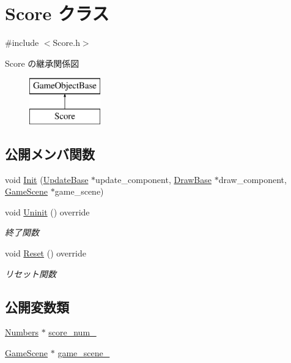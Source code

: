 \hypertarget{class_score}{}\section{Score クラス}
\label{class_score}


{\ttfamily \#include $<$Score.\+h$>$}

Score の継承関係図\begin{figure}[H]
\begin{center}
\leavevmode
\includegraphics[height=2.000000cm]{class_score}
\end{center}
\end{figure}
\subsection*{公開メンバ関数}
\begin{DoxyCompactItemize}
\item 
void \mbox{\hyperlink{class_score_a7d461a8b72ddfd00213858286d702486}{Init}} (\mbox{\hyperlink{class_update_base}{Update\+Base}} $\ast$update\+\_\+component, \mbox{\hyperlink{class_draw_base}{Draw\+Base}} $\ast$draw\+\_\+component, \mbox{\hyperlink{class_game_scene}{Game\+Scene}} $\ast$game\+\_\+scene)
\item 
void \mbox{\hyperlink{class_score_a605e163dc59ccc4d19a3cb6b5db813b8}{Uninit}} () override
\begin{DoxyCompactList}\small\item\em 終了関数 \end{DoxyCompactList}\item 
void \mbox{\hyperlink{class_score_ad01d461a2b6ca345858b2ae0a3d81cc1}{Reset}} () override
\begin{DoxyCompactList}\small\item\em リセット関数 \end{DoxyCompactList}\end{DoxyCompactItemize}
\subsection*{公開変数類}
\begin{DoxyCompactItemize}
\item 
\mbox{\hyperlink{class_numbers}{Numbers}} $\ast$ \mbox{\hyperlink{class_score_a5d178c5581627f1fa4c06f95f9558dcd}{score\+\_\+num\+\_\+}}
\item 
\mbox{\hyperlink{class_game_scene}{Game\+Scene}} $\ast$ \mbox{\hyperlink{class_score_ada5a957b01fbed0c1bb52cea4e1bcbc4}{game\+\_\+scene\+\_\+}}
\end{DoxyCompactItemize}
